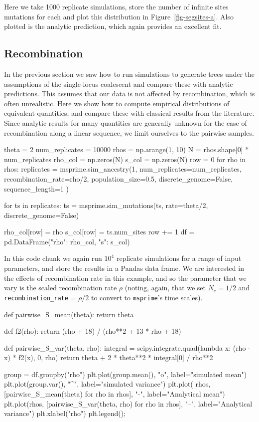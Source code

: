 \documentclass[graybox]{svmult}
\newcommand{\msprime}[0]{\texttt{msprime}}
\begin{document}
Here we take 1000 replicate simulations, store the number of infinite
sites mutations for each and plot this distribution in
Figure~\ref{fig-segsites-a}. Also plotted is the analytic prediction, which again provides an excellent fit.


\subsection{Recombination}

In the previous section we saw how to run simulations to generate trees
under the assumptions of the single-locus coalescent and compare these
with analytic predictions. This assumes that our data is not affected
by recombination, which is often unrealistic. Here we show how to
compute empirical distributions of equivalent quantities, and compare
these with classical results from the literature. Since analytic
results for many quantities are generally unknown for the case of recombination along a linear sequence, we limit ourselves to the pairwise samples.

\begin{pythoncode}
theta = 2
num_replicates = 10000
rhos = np.arange(1, 10)
N = rhos.shape[0] * num_replicates
rho_col = np.zeros(N)
s_col = np.zeros(N)
row = 0
for rho in rhos:
    replicates = msprime.sim_ancestry(1, num_replicates=num_replicates,
                                        recombination_rate=rho/2, population_size=0.5,
                                        discrete_genome=False, sequence_length=1
                                     )

    for ts in replicates:
        ts = msprime.sim_mutations(ts, rate=theta/2, discrete_genome=False)

        rho_col[row] = rho
        s_col[row] = ts.num_sites
        row += 1
df = pd.DataFrame({"rho": rho_col, "s": s_col})
\end{pythoncode}

In this code chunk we again run $10^4$ replicate simulations for a range
of input parameters, and store the results in a Pandas data frame. We
are interested in the effects of recombination rate in this example,
and so the parameter that we vary is the scaled recombination rate
$\rho$ (noting, again, that we set $N_e = 1/2$ and
\texttt{recombination\_rate} = $\rho / 2$ to convert to \msprime's
time scales).

\begin{pythoncode}
def pairwise_S_mean(theta):
    return theta

def f2(rho):
    return (rho + 18) / (rho**2 + 13 * rho + 18)

def pairwise_S_var(theta, rho):
    integral = scipy.integrate.quad(lambda x: (rho - x) * f2(x), 0, rho)
    return theta + 2 * theta**2 * integral[0] / rho**2

group = df.groupby("rho")
plt.plot(group.mean(), "o", label="simulated mean")
plt.plot(group.var(), "^", label="simulated variance")
plt.plot(
    rhos, [pairwise_S_mean(theta) for rho in rhos], "-",
    label="Analytical mean")
plt.plot(rhos, [pairwise_S_var(theta, rho) for rho in rhos], "--",
label="Analytical variance")
plt.xlabel("rho")
plt.legend();
\end{pythoncode}
\end{document}
